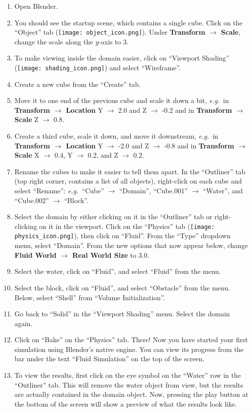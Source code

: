 \documentclass[12pt]{article}
\newcommand{\eg}{\emph{e.g.\ }}
\begin{document}
\begin{enumerate}
\item Open Blender.
\item You should see the startup scene, which contains a single cube. Click on the ``Object'' tab 
(\texttt{[image: object\_icon.png]}). Under {\bf Transform $\to$ Scale}, 
change the scale along the $y$-axis to 3.
\item To make viewing inside the domain easier, click on ``Viewport Shading'' 
(\texttt{[image: shading\_icon.png]}) and select ``Wireframe''.
\item Create a new cube from the ``Create'' tab.
\item Move it to one end of the previous cube and scale it down a bit, \eg in {\bf Transform $\to$ Location} 
Y $\to$ 2.0 and Z $\to$ -0.2 and in {\bf Transform $\to$ Scale} Z $\to$ 0.8.
\item Create a third cube, scale it down, and move it downstream, \eg in {\bf Transform $\to$ Location} Y 
$\to$ -2.0 and Z $\to$ -0.8 and in {\bf Transform $\to$ Scale} X $\to$ 0.4, Y $\to$ 0.2, and Z $\to$ 0.2.
\item Rename the cubes to make it easier to tell them apart. In the ``Outliner'' tab (top right corner, 
contains a list of all objects), right-click on each cube and select ``Rename'': \eg ``Cube'' $\to$ 
``Domain'', ``Cube.001'' $\to$ ``Water'', and ``Cube.002'' $\to$ ``Block''.
\item Select the domain by either clicking on it in the ``Outliner'' tab or right-clicking on it in the 
viewport. Click on the ``Physics'' tab (\texttt{[image: physics\_icon.png]}), then click on ``Fluid''. From the ``Type'' dropdown menu, select ``Domain''. From the 
new options that now appear below, change {\bf Fluid World $\to$ Real World Size} to 3.0.
\item Select the water, click on ``Fluid'', and select ``Fluid'' from the menu.
\item Select the block, click on ``Fluid'', and select ``Obstacle'' from the menu. Below, select ``Shell'' 
from ``Volume Initialization''.
\item Go back to ``Solid'' in the ``Viewport Shading'' menu. Select the domain again.
\item Click on ``Bake'' on the ``Physics'' tab. There! Now you have started your first simulation using 
Blender's native engine. You can view its progress from the bar under the text ``Fluid Simulation'' on the 
top of the screen.
\item To view the results, first click on the eye symbol on the ``Water'' row in the ``Outliner'' tab. This 
will remove the water object from view, but the results are actually contained in the domain object. Now, 
pressing the play button at the bottom of the screen will show a preview of what the results look like.
\end{enumerate}
\end{document}
